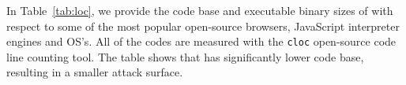  In Table~\ref{tab:loc}, we provide the code base and executable binary sizes of \device with respect to some of the most popular open-source browsers, JavaScript interpreter engines and OS's. All of the codes are measured with the \texttt{cloc} open-source code line counting tool. The table shows that \name has significantly lower code base, resulting in a smaller attack surface.


 

